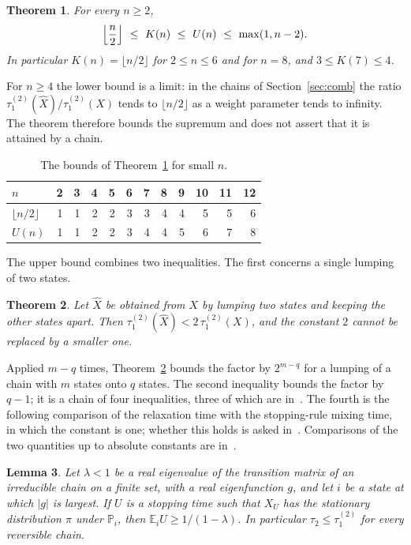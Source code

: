 \documentclass[11pt]{amsart}
\newtheorem{theorem}{Theorem}
\newtheorem{lemma}[theorem]{Lemma}
\theoremstyle{definition}
\newcommand{\Prob}{\mathbb{P}}
\newcommand{\E}{\mathbb{E}}
\newcommand{\tmix}{\tau_1^{(2)}}
\newcommand{\hX}{\widehat{X}}
\begin{document}
\begin{theorem}\label{thm:main}
For every $n\ge2$,
\[
\Bigl\lfloor\frac n2\Bigr\rfloor\ \le\ K(n)\ \le\ U(n)\ \le\ \max(1,n-2) .
\]
In particular $K(n)=\lfloor n/2\rfloor$ for $2\le n\le6$ and for $n=8$, and $3\le K(7)\le4$.
\end{theorem}

For $n\ge4$ the lower bound is a limit: in the chains of Section~\ref{sec:comb} the ratio
$\tmix(\hX)/\tmix(X)$ tends to $\lfloor n/2\rfloor$ as a weight parameter tends to infinity. The theorem therefore
bounds the supremum and does not assert that it is attained by a chain.

\begin{table}[tbp]
\centering
\begin{tabular}{lrrrrrrrrrrr}
\toprule
$n$ & 2 & 3 & 4 & 5 & 6 & 7 & 8 & 9 & 10 & 11 & 12\\
\midrule
$\lfloor n/2\rfloor$ & 1 & 1 & 2 & 2 & 3 & 3 & 4 & 4 & 5 & 5 & 6\\
$U(n)$ & 1 & 1 & 2 & 2 & 3 & 4 & 4 & 5 & 6 & 7 & 8\\
\bottomrule
\end{tabular}
\caption{The bounds of Theorem~\ref{thm:main} for small $n$.}\label{tab:bounds}
\end{table}

The upper bound combines two inequalities. The first concerns a single lumping of two states.

\begin{theorem}\label{thm:merge}
Let $\hX$ be obtained from $X$ by lumping two states and keeping the other states apart. Then
$\tmix(\hX)<2\,\tmix(X)$, and the constant $2$ cannot be replaced by a smaller one.
\end{theorem}

Applied $m-q$ times, Theorem~\ref{thm:merge} bounds the factor by $2^{m-q}$ for a lumping of a chain with $m$ states
onto $q$ states. The second inequality bounds the factor by $q-1$; it is a chain of four inequalities, three of which
are in~\cite{AF}. The fourth is the following comparison of the relaxation time with the stopping-rule mixing time, in
which the constant is one; whether this holds is asked in~\cite[Open Problem~4.48(b)]{AF}. Comparisons of the two
quantities up to absolute constants are in~\cite{Aldous82,LW98}.

\begin{lemma}\label{lem:relax}
Let $\lambda<1$ be a real eigenvalue of the transition matrix of an irreducible chain on a finite set, with a real
eigenfunction $g$, and let $i$ be a state at which $|g|$ is largest. If $U$ is a stopping time such that $X_U$ has the
stationary distribution $\pi$ under $\Prob_i$, then $\E_iU\ge 1/(1-\lambda)$. In particular $\tau_2\le\tmix$ for
every reversible chain.
\end{lemma}
\end{document}
